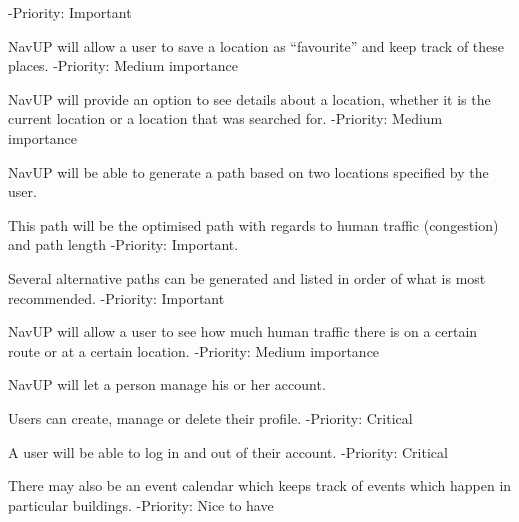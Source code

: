 \documentclass[12pt,a4paper]{article}
\begin{document}
\begin{RequirementsEnum}
\begin{RequirementsEnum}
    -Priority: Important
    \end{RequirementsEnum}     
\item NavUP will allow a user to save a location as “favourite” and keep track of these places.\newline
    -Priority: Medium importance
\item NavUP will provide an option to see details about a location, whether it is the current location or a location that was searched for.\newline
    -Priority: Medium importance
\item NavUP will be able to generate a path based on two locations specified by the user.
	\begin{RequirementsEnum}     
    	\item This path will be the optimised path with regards to human traffic (congestion) and path length\newline
	-Priority: Important.
    	\item Several alternative paths can be generated and listed in order of what is most recommended.
    -Priority: Important
    \end{RequirementsEnum}     
\item NavUP will allow a user to see how much human traffic there is on a certain route or at a certain location.\newline
    -Priority: Medium importance
\item NavUP will let a person manage his or her account.\newline
	\begin{RequirementsEnum}     
    	\item Users can create, manage or delete their profile.
	-Priority: Critical
    	\item A user will be able to log in and out of their account.
    -Priority: Critical
    \end{RequirementsEnum}  
\item There may also be an event calendar which keeps track of events which happen in particular buildings.\newline
    -Priority: Nice to have    
    

\end{RequirementsEnum}
\end{document}
